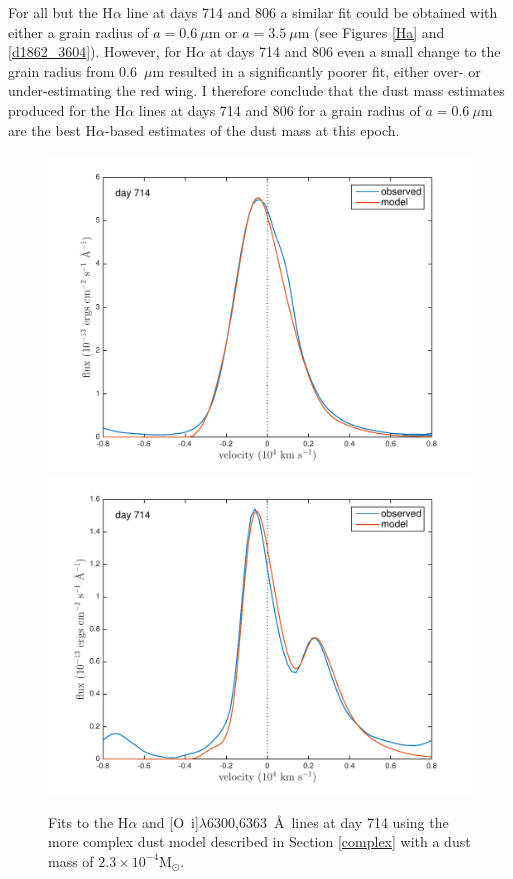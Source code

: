 For all but the H$\alpha$ line at days 714 and 806 a similar fit could be 
obtained with either a grain radius of $a=0.6~\mu$m or $a=3.5~\mu$m (see 
Figures \ref{Ha} and \ref{d1862_3604}).  However, for H$\alpha$ 
at days 714 and 806 even a small change to the grain radius from 0.6~$\mu$m resulted in a 
significantly poorer fit, either over- or under-estimating the red wing. 
I therefore conclude that the dust mass estimates produced for the 
H$\alpha$ lines at days 714 and 806 for a grain radius of $a=0.6~\mu$m are 
the best H$\alpha$-based estimates of the dust mass at this epoch.

\begin{figure}
\centering
\includegraphics[scale=0.42,clip=true,trim=40 0 40 20]{chapters/chapter5/images/HaOImod_Ha.pdf}
\includegraphics[scale=0.42, clip=true,trim=20 0 40 20]{chapters/chapter5/images/HaOImod_OI.pdf}
\caption{Fits to the H$\alpha$ and [O~{\sc i}]$\lambda$6300,6363~\AA\ lines at day 714 using the more complex dust model described in Section \ref{complex} with a dust mass of  $2.3 \times 10^{-4}$M$_{\odot}$.}
\label{HaOImod}
\end{figure}

